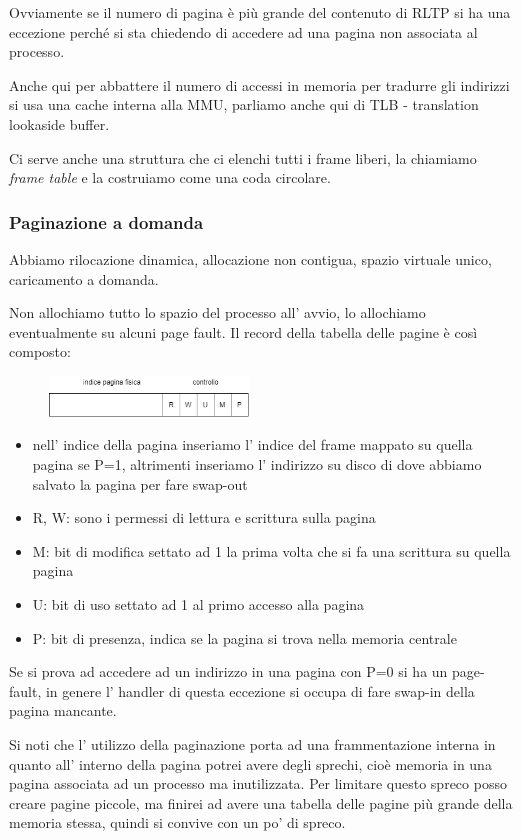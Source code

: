 Ovviamente se il numero di pagina è più grande del contenuto di RLTP si ha una eccezione perché si sta chiedendo di accedere ad una pagina non associata al processo.

Anche qui per abbattere il numero di accessi in memoria per tradurre gli indirizzi si usa una cache interna alla MMU, parliamo anche qui di TLB - translation lookaside buffer.

Ci serve anche una struttura che ci elenchi tutti i frame liberi, la chiamiamo \emph{frame table} e la costruiamo come una coda circolare.

\subsubsection{Paginazione a domanda}
Abbiamo rilocazione dinamica, allocazione non contigua, spazio virtuale unico, caricamento a domanda.

Non allochiamo tutto lo spazio del processo all' avvio, lo allochiamo eventualmente su alcuni page fault.
Il record della tabella delle pagine è così composto:
\begin{figure}[H]
    \centering
    \includegraphics[width=200px]{images/9_Gestione_della_memoria/page_record.png}
\end{figure}
\begin{itemize}
    \item nell' indice della pagina inseriamo l' indice del frame mappato su quella pagina se P=1, altrimenti inseriamo l' indirizzo su disco di dove abbiamo salvato la pagina per fare swap-out
    \item R, W: sono i permessi di lettura e scrittura sulla pagina
    \item M: bit di modifica settato ad 1 la prima volta che si fa una scrittura su quella pagina
    \item U: bit di uso settato ad 1 al primo accesso alla pagina
    \item P: bit di presenza, indica se la pagina si trova nella memoria centrale
\end{itemize}
Se si prova ad accedere ad un indirizzo in una pagina con P=0 si ha un page-fault, in genere l' handler di questa eccezione si occupa di fare swap-in della pagina mancante.

Si noti che l' utilizzo della paginazione porta ad una frammentazione interna in quanto all' interno della pagina potrei avere degli sprechi, cioè memoria in una pagina associata ad un processo ma inutilizzata.
Per limitare questo spreco posso creare pagine piccole, ma finirei ad avere una tabella delle pagine più grande della memoria stessa, quindi si convive con un po' di spreco.


